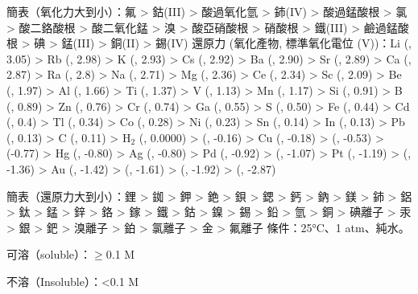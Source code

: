\documentclass[a4paper,12pt]{report}
\begin{document}
簡表（氧化力大到小）：氟 > 鈷(III) > 酸過氧化氫 > 鈰(IV) > 酸過錳酸根 > 氯 > 酸二鉻酸根 > 酸二氧化錳 > 溴 > 酸亞硝酸根 > 硝酸根  > 鐵(III) > 鹼過錳酸根 > 碘 > 錳(III) > 銅(II) > 錫(IV)
還原力 (氧化產物, 標準氧化電位 (V))：Li (, 3.05) > Rb (, 2.98) > K (, 2.93) > Cs (, 2.92) > Ba (, 2.90) > Sr (, 2.89) > Ca (, 2.87) > Ra (, 2.8) > Na (, 2.71) > Mg (, 2.36) > Ce (, 2.34) > Sc (, 2.09) > Be (, 1.97) > Al (, 1.66) > Ti (, 1.37) > V (, 1.13) > Mn (, 1.17) > Si (, 0.91) > B (, 0.89) > Zn (, 0.76) > Cr (, 0.74) > Ga (, 0.55) > S (, 0.50) > Fe (, 0.44) > Cd (, 0.4) > Tl (, 0.34) > Co (, 0.28) > Ni (, 0.23) > Sn (, 0.14) > In (, 0.13) > Pb (, 0.13) > C (, 0.11) > H$_2$ (, 0.0000) >  (, -0.16) > Cu (, -0.18) >  (, -0.53) >  (-0.77) > Hg (, -0.80) > Ag (, -0.80) > Pd (, -0.92) >  (, -1.07) > Pt (, -1.19) >  (, -1.36) > Au (, -1.42) >  (, -1.61) >  (, -1.92) >  (, -2.87)

簡表（還原力大到小）：鋰 > 銣 > 鉀 > 銫 > 鋇 > 鍶 > 鈣 > 鈉 > 鎂 > 鈰 > 鋁 > 鈦 > 錳 > 鋅 > 鉻 > 鎵 > 鐵 > 鈷 > 鎳 > 錫 > 鉛 > 氫 > 銅 > 碘離子 > 汞 > 銀 > 鈀 > 溴離子 > 鉑 > 氯離子 > 金 > 氟離子
條件：25°C、1 atm、純水。

\bit
\item 可溶（soluble）：$\geq$0.1 M
\item 不溶（Insoluble）：<0.1 M
\eit
\end{document}
